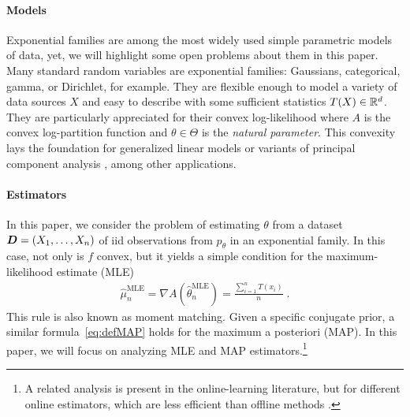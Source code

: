\documentclass[twoside]{article}
\newcommand{\logpart}{A}
\newcommand{\nat}{\theta}
\newcommand{\lin}[1]{\left\langle#1\right\rangle}
\begin{document}
\paragraph{Models}
Exponential families are among the most widely used simple parametric models of data, yet, we will highlight some open problems about them in this paper.
Many standard random variables are exponential families: Gaussians, categorical, gamma, or Dirichlet, for example.
They are flexible enough to model a variety of data sources $X$ and easy to describe with some sufficient statistics $T(X) \in \mathbb{R}^d$.
They are particularly appreciated for their convex log-likelihood
\alignn{
f(\nat) := \E[-\log p_\nat(X)] = \logpart(\nat) - \lin{\E[T(X)] , \nat},
\label{eq:defNLL}
}
where $\logpart$ is the convex log-partition function and $\nat\in\Theta$ is the \textit{natural parameter}.
This convexity lays the foundation for generalized linear models \citep{mccullagh1989generalized} or variants of principal component analysis \citep{collins2001generalization}, among other applications.

\paragraph{Estimators}
In this paper, we consider the problem of estimating $\nat$ from a dataset ${\bm{D}} = (X_1, \dots, X_n)$ of iid observations from $p_\theta$ in an exponential family.
In this case, not only is $f$ convex, but it yields a simple condition for the maximum-likelihood estimate (MLE)
\begin{align}
 \hat \mu_n^\text{MLE} = \nabla  \logpart(\hat \nat_n^\text{MLE}) = \frac{\sum_{i=1}^n T(x_i)}{n} \; .
	\label{eq:defMLE}
\end{align}
This rule is also known as moment matching.
Given a specific conjugate prior, a similar formula~\eqref{eq:defMAP} holds for the maximum a posteriori (MAP). In this paper, we will focus on analyzing MLE and MAP estimators.\footnote{A related analysis is present in the online-learning literature, but for different online estimators, which are less efficient than offline methods \citep{azoury2001relative,dasgupta2007online}.}
\end{document}
